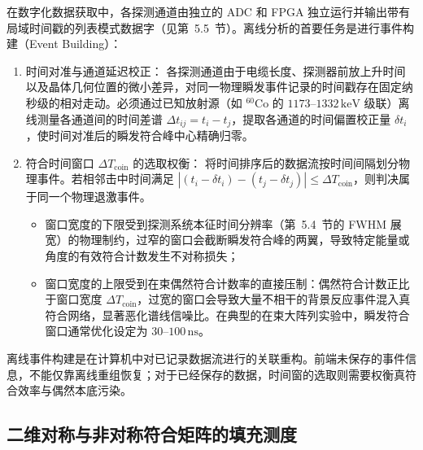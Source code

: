 在数字化数据获取中，各探测通道由独立的 ADC 和 FPGA 独立运行并输出带有局域时间戳的列表模式数据字（见第~5.5~节）。离线分析的首要任务是进行事件构建（Event Building）：
\begin{enumerate}
\item 时间对准与通道延迟校正：
各探测通道由于电缆长度、探测器前放上升时间以及晶体几何位置的微小差异，对同一物理瞬发事件记录的时间戳存在固定纳秒级的相对走动。必须通过已知放射源（如 $^{60}\mathrm{Co}$ 的 $1173\text{--}1332\,\text{keV}$ 级联）离线测量各通道间的时间差谱 $\Delta t_{ij} = t_i - t_j$，提取各通道的时间偏置校正量 $\delta t_i$，使时间对准后的瞬发符合峰中心精确归零。
\item 符合时间窗口 $\Delta T_{\mathrm{coin}}$ 的选取权衡：
将时间排序后的数据流按时间间隔划分物理事件。若相邻击中时间满足 $|(t_i - \delta t_i) - (t_j - \delta t_j)| \le \Delta T_{\mathrm{coin}}$，则判决属于同一个物理退激事件。
\begin{itemize}
\item 窗口宽度的下限受到探测系统本征时间分辨率（第~5.4~节的 FWHM 展宽）的物理制约，过窄的窗口会截断瞬发符合峰的两翼，导致特定能量或角度的有效符合计数发生不对称损失；
\item 窗口宽度的上限受到在束偶然符合计数率的直接压制：偶然符合计数正比于窗口宽度 $\Delta T_{\mathrm{coin}}$，过宽的窗口会导致大量不相干的背景反应事件混入真符合网络，显著恶化谱线信噪比。在典型的在束大阵列实验中，瞬发符合窗口通常优化设定为 $30\text{--}100\,\text{ns}$。
\end{itemize}
\end{enumerate}
离线事件构建是在计算机中对已记录数据流进行的关联重构。前端未保存的事件信息，不能仅靠离线重组恢复；对于已经保存的数据，时间窗的选取则需要权衡真符合效率与偶然本底污染。

\subsection{二维对称与非对称符合矩阵的填充测度}\label{subsec:5-6-2}

